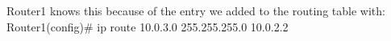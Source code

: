Router1 knows this because of the entry we added to the routing table with:
	Router1(config)# ip route 10.0.3.0 255.255.255.0 10.0.2.2